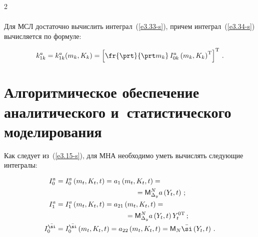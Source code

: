 \begin{multicols}{2}
\begin{align}
   \end{align}



Для МСЛ достаточно вычислить интеграл~(\ref{e3.33-s}), причем интеграл~(\ref{e3.34-s}) вычисляется по формуле:

    \begin{equation*}

    k_{1k}^a = k_{1k}^a (m_k, K_k) =\left[ \fr{\prt}{\prt m_k}\, I_{0k}^a \left(m_k, K_k\right)^{\mathrm{T}}\right]^{\mathrm{T}}\,. %

    \end{equation*}



  \section{Алгоритмическое обеспечение аналитического и~статистического моделирования}



  \vspace*{-2pt}



Как следует из~(\ref{e3.15-s}), для МНА необходимо уметь вычислять следующие интегралы:



\noindent

    \begin{align}

    I_0^a &= I_0^a \left(m_t, K_t, t\right) = a_1 \left(m_t, K_t, t\right)={}\notag\\

    &\hspace*{40mm}{}={\sf M}_{\Delta_y}^N a\left(Y_t, t\right)\,; \label{e4.1-s}

\\

   I_1^a &= I_1^a \left(m_t, K_t, t\right)= a_{21}\left(m_t, K_t, t\right)= {}\notag\\

&  \hspace*{35mm}{}=  {\sf M}_{\Delta_y}^N a\left(Y_t , t\right) Y_t^{0\mathrm{T}}\,;\notag %

   \\

    I_0^{\bar \si} &= I_0^{\bar \si} \left(m_t, K_t, t\right) = a_{22}\left(m_t, K_t, t\right) ={\sf M}_N \bar \si \left(Y_t, t\right)\,.\notag %

    \end{align}




\end{multicols}
